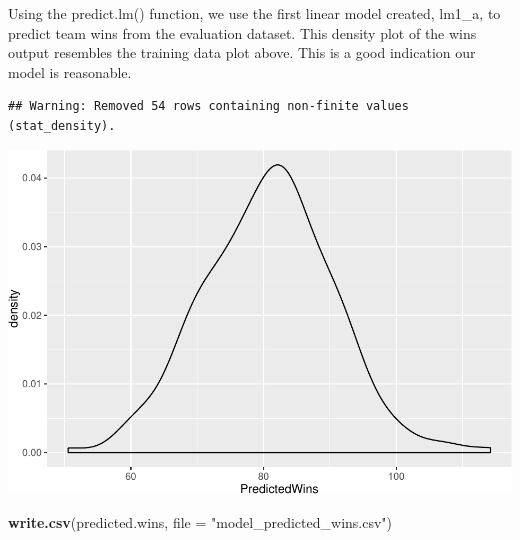 \documentclass[]{article}
\newenvironment{Shaded}{\begin{snugshade}}{\end{snugshade}}
\newcommand{\KeywordTok}[1]{\textcolor[rgb]{0.13,0.29,0.53}{\textbf{{#1}}}}
\newcommand{\DataTypeTok}[1]{\textcolor[rgb]{0.13,0.29,0.53}{{#1}}}
\newcommand{\StringTok}[1]{\textcolor[rgb]{0.31,0.60,0.02}{{#1}}}
\newcommand{\NormalTok}[1]{{#1}}
\begin{document}
Using the predict.lm() function, we use the first linear model created,
lm1\_a, to predict team wins from the evaluation dataset. This density
plot of the wins output resembles the training data plot above. This is
a good indication our model is reasonable.

\begin{verbatim}
## Warning: Removed 54 rows containing non-finite values (stat_density).
\end{verbatim}

\includegraphics{DATA621-Homework-1_files/figure-latex/unnamed-chunk-29-1.pdf}

\begin{Shaded}
\begin{Highlighting}[]
\KeywordTok{write.csv}\NormalTok{(predicted.wins, }\DataTypeTok{file =} \StringTok{"model_predicted_wins.csv"}\NormalTok{)}
\end{Highlighting}
\end{Shaded}
\end{document}
